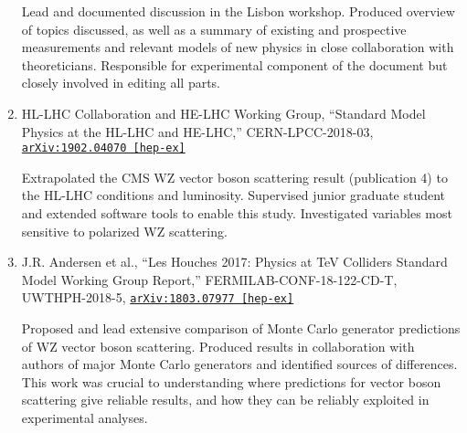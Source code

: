 \documentclass[10pt]{res} %
\begin{document}
\begin{resume}
\begin{enumerate}
    Lead and documented discussion in the Lisbon workshop.
    Produced overview of topics discussed, as well as a summary of existing and prospective measurements and relevant models of new physics in 
    close collaboration with theoreticians. 
    Responsible for experimental component of the document but closely involved in editing all parts.
  \item HL-LHC Collaboration and HE-LHC Working Group, ``Standard Model Physics at the HL-LHC and HE-LHC,''
    CERN-LPCC-2018-03, \href{https://arxiv.org/abs/1902.04070}{\texttt{arXiv:1902.04070 [hep-ex]}}

    Extrapolated the CMS WZ vector boson scattering result (publication 4) to the HL-LHC conditions and luminosity. Supervised junior
    graduate student and extended software tools to enable this study. Investigated variables most sensitive to 
    polarized WZ scattering.
  \item J.R. Andersen et al., ``Les Houches 2017: Physics at TeV Colliders Standard Model Working Group Report,''
    FERMILAB-CONF-18-122-CD-T, UWTHPH-2018-5, \href{https://arxiv.org/abs/1803.07977}{\texttt{arXiv:1803.07977 [hep-ex]}}

    Proposed and lead extensive comparison of Monte Carlo generator predictions of WZ vector boson scattering.
    Produced results in collaboration with authors of major Monte Carlo generators and identified sources of differences.
    This work was crucial to understanding where predictions for vector boson scattering give reliable results,
    and how they can be reliably exploited in experimental analyses.
\end{enumerate}

\end{resume}
\end{document}
